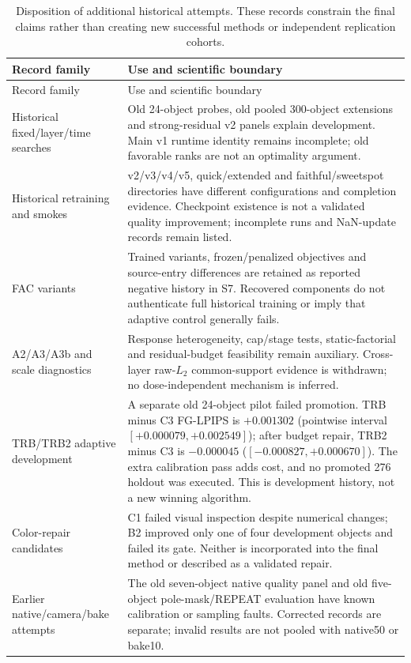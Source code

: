 \documentclass[11pt]{article}
\begin{document}
\begingroup\small
\begin{longtable}{p{3.3cm}p{10.3cm}}
\caption{Disposition of additional historical attempts. These records constrain the final claims rather than creating new successful methods or independent replication cohorts.}\\
\toprule Record family & Use and scientific boundary \\
\midrule\endfirsthead
\toprule Record family & Use and scientific boundary \\
\midrule\endhead
Historical fixed/layer/time searches & Old 24-object probes, old pooled 300-object extensions and strong-residual v2 panels explain development. Main v1 runtime identity remains incomplete; old favorable ranks are not an optimality argument. \\
Historical retraining and smokes & v2/v3/v4/v5, quick/extended and faithful/sweetspot directories have different configurations and completion evidence. Checkpoint existence is not a validated quality improvement; incomplete runs and NaN-update records remain listed. \\
FAC variants & Trained variants, frozen/penalized objectives and source-entry differences are retained as reported negative history in S7. Recovered components do not authenticate full historical training or imply that adaptive control generally fails. \\
A2/A3/A3b and scale diagnostics & Response heterogeneity, cap/stage tests, static-factorial and residual-budget feasibility remain auxiliary. Cross-layer raw-$L_2$ common-support evidence is withdrawn; no dose-independent mechanism is inferred. \\
TRB/TRB2 adaptive development & A separate old 24-object pilot failed promotion. TRB minus C3 FG-LPIPS is $+0.001302$ (pointwise interval $[+0.000079,+0.002549]$); after budget repair, TRB2 minus C3 is $-0.000045$ ($[-0.000827,+0.000670]$). The extra calibration pass adds cost, and no promoted 276 holdout was executed. This is development history, not a new winning algorithm. \\
Color-repair candidates & C1 failed visual inspection despite numerical changes; B2 improved only one of four development objects and failed its gate. Neither is incorporated into the final method or described as a validated repair. \\
Earlier native/camera/bake attempts & The old seven-object native quality panel and old five-object pole-mask/REPEAT evaluation have known calibration or sampling faults. Corrected records are separate; invalid results are not pooled with native50 or bake10. \\

\end{longtable}
\end{document}
